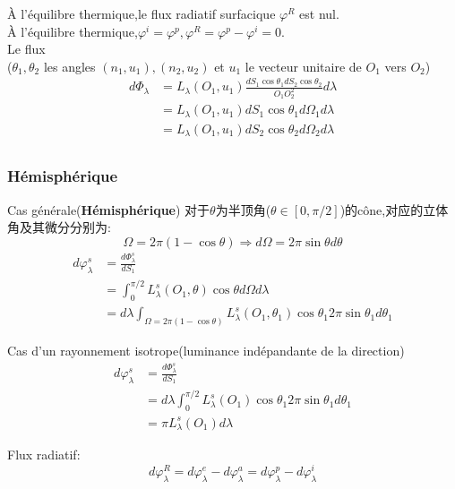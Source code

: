 \documentclass[openany]{book}
\begin{document}
\`A l'\'equilibre thermique,le flux radiatif surfacique $\varphi^R$ est nul.\\
\`A l'\'equilibre thermique,$\varphi^i=\varphi^p,\varphi^R=\varphi^p-\varphi^i=0$. \\
Le flux\\
($\theta_1,\theta_2$ les angles $(n_1,u_1),(n_2,u_2)$ et $u_1$ le vecteur unitaire de $O_1$ vers $O_2$)
\begin{equation}
\begin{split}
d \Phi_{\lambda } & = L_{\lambda}(O_1,u_1) \frac{d S_1 \cos \theta_1  d S_2 \cos \theta_2}{O_1 O_2^2} d \lambda \\
& =  L_{\lambda}(O_1,u_1) d S_1 \cos \theta_1 d\Omega_1 d \lambda \\
& = L_{\lambda}(O_1,u_1) d S_2 \cos \theta_2 d\Omega_2 d \lambda\\
\end{split}
\end{equation}
\subsubsection{H\'emisph\'erique}
Cas g\'en\'erale(\textbf{H\'emisph\'erique})
对于$\theta$为半顶角($\theta \in [0,\pi/2]$)的c\^one,对应的立体角及其微分分别为:
$$\Omega = 2\pi(1-\cos \theta) \Rightarrow d\Omega=2\pi \sin \theta d\theta $$
\begin{equation}
	\begin{split}
d\varphi_{\lambda }^s  & = \frac{d \Phi_{\lambda }^s}{dS_1} \\
 & =  \int_{0}^{\pi/2}L_{\lambda }^s(O_1,\theta)\cos \theta d\Omega d \lambda \\
 & = d \lambda \int_{\Omega = 2\pi(1-\cos \theta)} L_{\lambda }^s(O_1,\theta_1)\cos \theta_1 2\pi \sin\theta_1 d\theta_1
	\end{split}
\end{equation}

Cas d'un rayonnement isotrope(luminance ind\'epandante de la direction)
\begin{equation}
	\begin{split}
d\varphi_{\lambda }^s &= \frac{d \Phi_{\lambda }^s}{dS_1}\\
&=d \lambda \int_{0}^{\pi/2}L_{\lambda }^s(O_1)\cos \theta_1 2\pi \sin\theta_1 d\theta_1 \\
&= \pi L_{\lambda }^s(O_1)d\lambda
	\end{split}
\end{equation}

Flux radiatif:
$$d\varphi_{\lambda }^R =d\varphi_{\lambda }^e - d\varphi_{\lambda }^a = d\varphi_{\lambda }^p - d\varphi_{\lambda }^i$$
\end{document}
